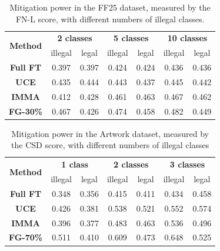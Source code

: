 \documentclass{article}
\begin{document}
\begin{table}[ht]
	\centering
	{\fontsize{9}{9}\selectfont
		\begin{tabular}{ccccccc}
			\toprule
			\multirow{2}{*}{\textbf{Method}} & \multicolumn{2}{c}{\textbf{2 classes}} & \multicolumn{2}{c}{\textbf{5 classes}} & \multicolumn{2}{c}{\textbf{10 classes}}\\
			\cmidrule(ll){2-7}
			& illegal &legal& illegal &legal& illegal &legal\\
			\midrule[1pt]
			\textbf{Full FT} &0.397&0.397&0.424&0.424&0.436&0.436\\ \midrule
			\textbf{UCE} &0.435&0.444&0.443&0.437&0.445&0.442\\ \midrule
			\textbf{IMMA} &0.412&0.428&0.461&0.463&0.467&0.462\\ \midrule
			\textbf{FG-30\%} &0.467&0.426&0.474&0.458&0.482&0.449\\
			\bottomrule
	\end{tabular}}
	\vspace{0.1in}
	\caption{Mitigation power in the FF25 dataset, measured by the FN-L score, with different numbers of illegal classes.}
	\vspace{-0.1in}
	\label{tab:ff25_classes}
\end{table}
\vspace{-0.05in}


\begin{table}[ht]
	\centering
	{\fontsize{7.5}{9}\selectfont
		\begin{tabular}{ccccccc}
			\toprule
			\multirow{2}{*}{\textbf{Method}} & \multicolumn{2}{c}{\textbf{1 class}} & \multicolumn{2}{c}{\textbf{2 classes}} & \multicolumn{2}{c}{\textbf{3 classes}}\\
			\cmidrule(ll){2-7}
			& illegal &legal& illegal &legal& illegal &legal\\
			\midrule
			\textbf{Full FT} &0.348& 0.356& 0.415& 0.411& 0.434& 0.458\\ \midrule
			\textbf{UCE} &0.426& 0.381& 0.538& 0.521& 0.552& 0.574 \\ \midrule
			\textbf{IMMA} &0.396 &0.377 &0.483 &0.463 &0.536& 0.496 \\ \midrule
			\textbf{FG-70\%} &0.511 &0.410& 0.609& 0.473& 0.648& 0.525 \\
			\bottomrule
	\end{tabular}}
	\vspace{0.1in}
	\caption{Mitigation power in the Artwork dataset, measured by the CSD score, with different numbers of illegal classes}
	\vspace{-0.2in}
	\label{tab:art_classes}
\end{table}
\end{document}
